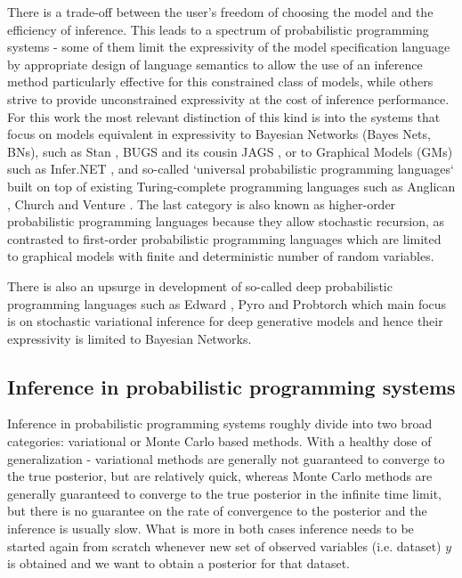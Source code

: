 \documentclass[12pt]{article}
\begin{document}
There is a trade-off between the user's freedom of choosing the model and the efficiency of inference.
This leads to a spectrum of probabilistic programming systems - some of them limit the expressivity of the model specification language by appropriate design of language semantics to allow the use of an inference method particularly effective for this constrained class of models, while others strive to provide unconstrained expressivity at the cost of inference performance.
For this work the most relevant distinction of this kind is into the systems that focus on models equivalent in expressivity to Bayesian Networks (Bayes Nets, BNs), such as Stan \citep{Stan}, BUGS \citep{WinBUGS,BUGSproject} and its cousin JAGS \citep{JAGS}, or to Graphical Models (GMs) such as Infer.NET \citep{InferNET}, and so-called `universal probabilistic programming languages` built on top of existing Turing-complete programming languages such as Anglican \citep{anglican}, Church \citep{GoodmanEtAl2008} and Venture \citep{venture}.
The last category is also known as higher-order probabilistic programming languages because they allow stochastic recursion, as contrasted to first-order probabilistic programming languages which are limited to graphical models with finite and deterministic number of random variables.

There is also an upsurge in development of so-called deep probabilistic programming languages such as Edward \citep{TranEtAl2016}, Pyro \citep{Pyro2018} and Probtorch \citep{Siddharth2017} which main focus is on stochastic variational inference for deep generative models and hence their expressivity is limited to Bayesian Networks.




\subsection{Inference in probabilistic programming systems}
Inference in probabilistic programming systems roughly divide into two broad categories: variational or Monte Carlo based methods.
With a healthy dose of generalization - variational methods are generally not guaranteed to converge to the true posterior, but are relatively quick, whereas Monte Carlo methods are generally guaranteed to converge to the true posterior in the infinite time limit, but there is no guarantee on the rate of convergence to the posterior and the inference is usually slow.
What is more in both cases inference needs to be started again from scratch whenever new set of observed variables (i.e. dataset) $y$ is obtained and we want to obtain a posterior for that dataset.  
\end{document}

